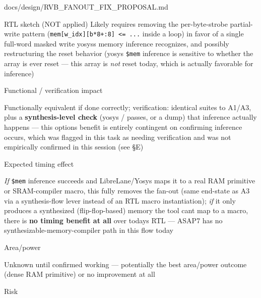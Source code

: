 \begin{relocated}{docs/design/RVB_FANOUT_FIX_PROPOSAL.md}
\begin{rowtable}
\begin{rowcell}{RTL sketch (NOT applied)}
Likely requires removing the per-byte-strobe partial-write pattern
(\texttt{mem[w\_\allowbreak{}idx][b*8+\allowbreak{}:\allowbreak{}8]\ <=\allowbreak{}\ .\allowbreak{}.\allowbreak{}.\allowbreak{}}
inside a loop) in favor of a single full-word masked write
yosys\textquotesingle s memory inference recognizes, and possibly
restructuring the reset behavior (yosys \texttt{\$mem} inference is
sensitive to whether the array is ever reset --- this array is
\emph{not} reset today, which is actually favorable for inference)

\end{rowcell}

\begin{rowcell}{Functional / verification impact}

Functionally equivalent if done correctly; verification: identical
suites to A1/A3, plus a \textbf{synthesis-level check} (yosys
/ passes, or a  dump)
that inference actually happens --- this option\textquotesingle s
benefit is entirely contingent on confirming inference occurs, which was
flagged in this task as needing verification and was not empirically
confirmed in this session (see §E)

\end{rowcell}

\begin{rowcell}{Expected timing effect}

\emph{If} \texttt{\$mem} inference succeeds and
LibreLane/\allowbreak{}Yosys maps it to a real RAM primitive or
SRAM-compiler macro, this fully removes the fan-out (same end-state as
A3 via a synthesis-flow lever instead of an RTL macro instantiation);
\emph{if} it only produces a synthesized (flip-flop-based) memory the
tool can\textquotesingle t map to a macro, there is \textbf{no timing
benefit at all} over today\textquotesingle s RTL --- ASAP7 has no
synthesizable-memory-compiler path in this flow today

\end{rowcell}

\begin{rowcell}{Area/\allowbreak{}power}

Unknown until confirmed working --- potentially the best
area/\allowbreak{}power outcome (dense RAM primitive) or no improvement
at all

\end{rowcell}

\begin{rowcell}{Risk}


\end{rowcell}
\end{rowtable}
\end{relocated}
